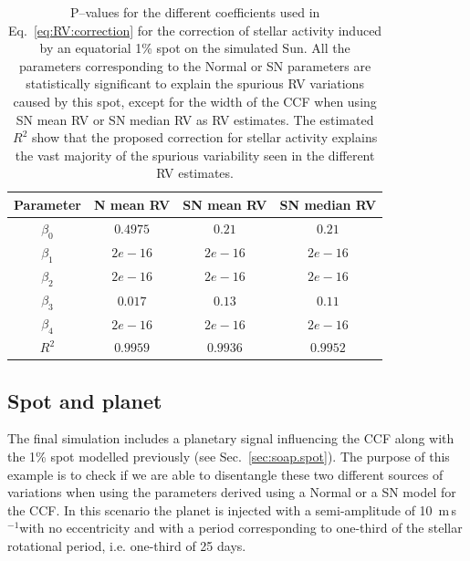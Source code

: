 \documentclass{aa}
\def\ms{\hbox{\,m\,s$^{-1}$}}         %
\begin{document}
\begin{table}
\begin{center}
\caption{P--values for the different coefficients used in Eq.~\eqref{eq:RV:correction} for the correction of stellar activity induced by an equatorial 1\% spot on the simulated Sun. All the parameters corresponding to the Normal or SN parameters are statistically significant to explain the spurious RV variations caused by this spot, except for the width of the CCF when using SN mean RV or SN median RV as RV estimates. The estimated $R^{2}$ show that the proposed correction for stellar activity explains the vast majority of the spurious variability seen in the different RV estimates.}
\label{table:spot.test}
\begin{tabular}{|c|c|c|c|}
\hline
Parameter          & N mean RV         &   SN mean RV &   SN median RV \\
\hline
$\beta_{0}$            &    $0.4975$    & $0.21$ & $0.21$ \\
\hline
$\beta_{1}$            &    $2e-16$    & $2e-16$ & $2e-16$ \\
\hline
$\beta_{2}$            &     $2e-16$   &  $2e-16$ & $2e-16$\\
\hline
$\beta_{3}$            &     $0.017$   &  $0.13$ & $0.11$\\
\hline
$\beta_{4}$            &     $2e-16$   &  $2e-16$ & $2e-16$\\
\hline
$R^{2}$      &     $0.9959$    &  $0.9936$ & $0.9952$  \\
\hline
\end{tabular}
\end{center}
\end{table}











\subsection{Spot and planet} \label{sec:soap.spot.planet}

The final simulation includes a planetary signal influencing the CCF along with the 1\% spot modelled previously (see Sec.~\ref{sec:soap.spot}). 
The purpose of this example is to check if we are able to disentangle these two different sources of variations when using the parameters derived using a Normal or a SN model for the CCF. In this scenario the planet is injected with a semi-amplitude of 10 \ms with no eccentricity and with a period corresponding to one-third of the stellar rotational period, i.e. one-third of 25 days.
\end{document}
